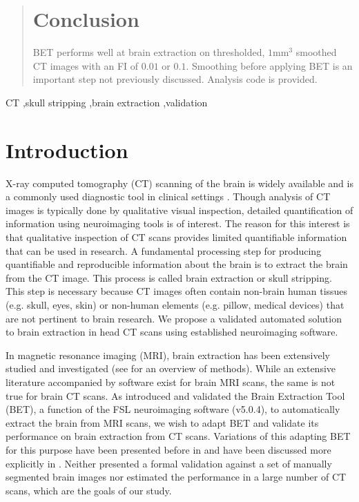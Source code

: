 \documentclass{elsarticle}\usepackage[]{graphicx}\usepackage[]{color}
\begin{document}
\begin{frontmatter}
\begin{abstract}
\section*{Conclusion}

BET performs well at brain extraction on thresholded, $1$mm$^3$ smoothed CT images with an FI of $0.01$ or $0.1$.  Smoothing before applying BET is an important step not previously discussed.  Analysis code is provided.

\end{abstract}

\begin{keyword}
CT \sep skull stripping \sep brain extraction \sep validation
\end{keyword}

\end{frontmatter}



\section{Introduction}

X-ray computed tomography (CT) scanning of the brain is widely available and is a commonly used diagnostic tool in clinical settings \citep{sahni_management_2007, chalela2007magnetic, schellinger1999standardized}. Though analysis of CT images is typically done by qualitative visual inspection, detailed quantification of information using neuroimaging tools is of interest.  The reason for this interest is that qualitative inspection of CT scans provides limited quantifiable information that can be used in research. A fundamental processing step for producing quantifiable and  reproducible information about the brain is to extract the brain from the CT image. This process is called brain extraction or skull stripping.  This step is necessary because CT images often contain non-brain human tissues (e.g. skull, eyes, skin) or non-human elements (e.g. pillow, medical devices) that are not pertinent to brain research.  We propose a validated automated solution to brain extraction in head CT scans using established neuroimaging software.

In magnetic resonance imaging (MRI), brain extraction has been extensively studied and investigated (see \citet{wang2014knowledge} for an overview of methods).  While an extensive literature accompanied by software exist for brain MRI scans, the same is not true for brain CT scans.  As \citet{smith_fast_2002} introduced and validated the Brain Extraction Tool (BET), a function of the FSL \citep{jenkinson_fsl_2012} neuroimaging software (v5.0.4), to automatically extract the brain from MRI scans, we wish to adapt BET and validate its performance on brain extraction from CT scans.  Variations of this adapting BET for this purpose have been presented before in \citet{solomon_user-friendly_2007} and have been discussed more explicitly in \citet{rorden_age-specific_2012}.  Neither presented a formal validation against a set of manually segmented brain images nor estimated the performance in a large number of CT scans, which are the goals of our study. 
\end{document}
